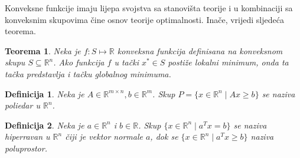 \documentclass[a4paper, utf8, 11pt, colorlinks]{book}
\newtheorem{definition}{Definicija}[chapter]
\newtheorem{thm}{Teorema}[chapter]
\theoremstyle{definition}
\begin{document}
Konveksne funkcije imaju lijepa svojstva sa stanovišta teorije i u kombinaciji sa konveksnim skupovima čine osnov  teorije optimalnosti. Inače, vrijedi sljedeća teorema.
\begin{thm}\label{thm:globalopt}
  Neka je $f : S \mapsto \mathbb{R}$ konveksna funkcija definisana na konveksnom skupu $S \subseteq \mathbb{R}^n$. Ako funkcija $f$ u tački $x^* \in S$
 postiže lokalni minimum, onda ta tačka predstavlja i tačku globalnog minimuma.
\end{thm}

\begin{definition}
   Neka je $A \in \mathbb{R}^{m \times n}, b \in \mathbb{R}^m$. Skup $P=\{x \in \mathbb{R}^n \mid Ax \geq b\}$ se naziva poliedar u $\mathbb{R}^n$. 
\end{definition}
\begin{definition}
   Neka je $a\in \mathbb{R}^n $ i $b \in \mathbb{R}$. Skup $\{ x \in \mathbb{R}^n \mid a^T x = b \}$ se naziva hiperravan u $\mathbb{R}^n$ čiji je vektor  normale $a$, dok se $\{ x \in \mathbb{R}^n \mid a^T x \geq b \}$ naziva poluprostor. 
\end{definition}
\end{document}
